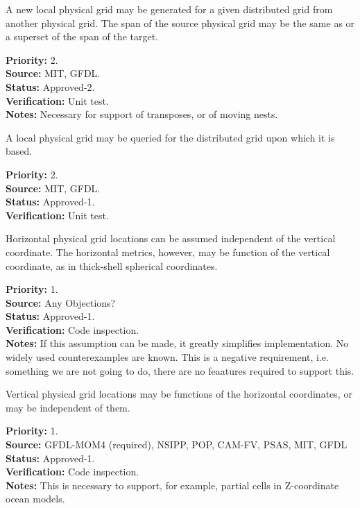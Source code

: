 A new local physical grid may be generated for a given distributed grid from another 
physical grid.
The span of the source physical grid may be the same as or a superset of
the span of the target.
\begin{reqlist}
{\bf Priority:} 2. \\
{\bf Source:} MIT, GFDL. \\
{\bf Status:} Approved-2. \\
{\bf Verification:} Unit test.\\
{\bf Notes:} Necessary for support of transposes, or of moving nests.
\end{reqlist}

A local physical grid may be queried for the distributed grid upon which it is based.
\begin{reqlist}
{\bf Priority:} 2. \\
{\bf Source:}  MIT, GFDL.\\
{\bf Status:} Approved-1. \\
{\bf Verification:} Unit test. 
\end{reqlist}

Horizontal physical grid locations can be assumed independent of the vertical coordinate.
The horizontal metrics, however, may be function of the vertical coordinate, as
in thick-shell spherical coordinates.
\begin{reqlist}
{\bf Priority:} 1. \\
{\bf Source:} Any Objections? \\
{\bf Status:} Approved-1. \\
{\bf Verification:} Code inspection.\\
{\bf Notes:} If this assumption can be made, it greatly simplifies implementation.
No widely used counterexamples are known. This is a negative
requirement, i.e. something we are not going to do, there are no feaatures
required to support this.
\end{reqlist}

Vertical physical grid locations may be functions of the horizontal coordinates, or may be
independent of them.
\begin{reqlist}
{\bf Priority:} 1. \\
{\bf Source:} GFDL-MOM4 (required), NSIPP, POP, 
              CAM-FV, PSAS, MIT, GFDL \\
{\bf Status:} Approved-1. \\
{\bf Verification:} Code inspection.\\
{\bf Notes:} This is necessary to support, for example, partial cells in
Z-coordinate ocean models.
\end{reqlist}

